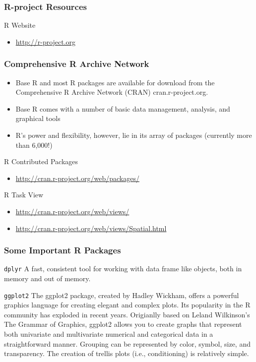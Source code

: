 	\begin{frame}
	\frametitle{R-project Resources}
	\begin{block}{R Website}
	\begin{itemize}
		\item \url{http://r-project.org}
	\end{itemize}
	\end{block}
	\end{frame}

 	\begin{frame}
 		\frametitle{Comprehensive R Archive Network}
 		\begin{itemize}
 			\item Base R and most R packages are available for download from the Comprehensive R Archive Network
 			(CRAN) cran.r-project.org. 
 			\item Base R comes with a number of basic data management,
 			analysis, and graphical tools 
 			\item R’s power and flexibility, however, lie in its array of packages
 			(currently more than 6,000!)
 		\end{itemize}
 		
 	\end{frame}

	\begin{frame}
	\begin{block}{R Contributed Packages}
	\begin{itemize}
		\item \url{http://cran.r-project.org/web/packages/}
	\end{itemize}
	\end{block}
	\begin{block}{R Task View}
	\begin{itemize}
		\item \url{http://cran.r-project.org/web/views/}
		\item \url{http://cran.r-project.org/web/views/Spatial.html}
	\end{itemize}
	\end{block}
	\end{frame}

	\begin{frame}
	\frametitle{Some Important R Packages}

	\begin{block}{\texttt{dplyr}}
	A fast, consistent tool for working with data frame like objects,
	both in memory and out of memory.
	\end{block}

	\begin{block}{\texttt{ggplot2}}
	The ggplot2 package, created by Hadley Wickham, offers a powerful graphics language for creating elegant and complex plots. Its popularity in the R community has exploded in recent years. Origianlly based on Leland Wilkinson's The Grammar of Graphics, ggplot2 allows you to create graphs that represent both univariate and multivariate numerical and categorical data in a straightforward manner. Grouping can be represented by color, symbol, size, and transparency. The creation of trellis plots (i.e., conditioning) is relatively simple. 
	\end{block}
	\end{frame}

